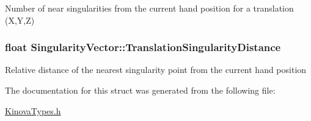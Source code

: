 Number of near singularities from the current hand position for a translation (X,Y,Z) \hypertarget{struct_singularity_vector_affe09808366cb7e82427a978cbb1af6a}{
\subsubsection[{Translation\-Singularity\-Distance}]{\setlength{\rightskip}{0pt plus 5cm}float Singularity\-Vector\-::\-Translation\-Singularity\-Distance}}\label{struct_singularity_vector_affe09808366cb7e82427a978cbb1af6a}
Relative distance of the nearest singularity point from the current hand position 

The documentation for this struct was generated from the following file\-:\begin{DoxyCompactItemize}
\item 
\hyperlink{_kinova_types_8h}{Kinova\-Types.\-h}\end{DoxyCompactItemize}
